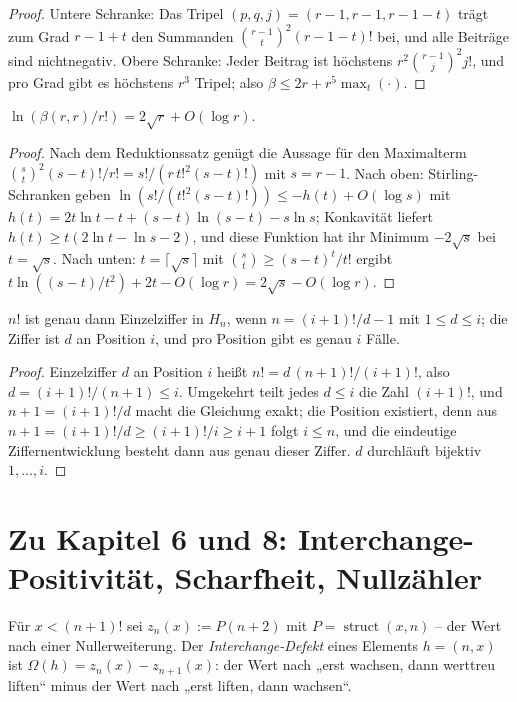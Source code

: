 \begin{proof}
Untere Schranke: Das Tripel $(p,q,j)=(r{-}1,r{-}1,r{-}1{-}t)$ trägt
zum Grad $r{-}1{+}t$ den Summanden
$\binom{r-1}{t}^2(r{-}1{-}t)!$ bei, und alle Beiträge sind
nichtnegativ. Obere Schranke: Jeder Beitrag ist höchstens
$r^2\binom{r-1}{j}^2j!$, und pro Grad gibt es höchstens $r^3$
Tripel; also $\beta\le2r+r^5\max_t(\cdot)$.
\end{proof}

\begin{satz}
$\ln(\beta(r,r)/r!)=2\sqrt r+O(\log r)$.
\end{satz}

\begin{proof}
Nach dem Reduktionssatz genügt die Aussage für den Maximalterm
$\binom st^2(s-t)!/r!=s!/(r\,t!^2(s-t)!)$ mit $s=r-1$. Nach oben:
Stirling-Schranken geben $\ln(s!/(t!^2(s-t)!))\le-h(t)+O(\log s)$
mit $h(t)=2t\ln t-t+(s{-}t)\ln(s{-}t)-s\ln s$; Konkavität liefert
$h(t)\ge t(2\ln t-\ln s-2)$, und diese Funktion hat ihr Minimum
$-2\sqrt s$ bei $t=\sqrt s$. Nach unten: $t=\lceil\sqrt s\rceil$
mit $\binom st\ge(s-t)^t/t!$ ergibt
$t\ln((s-t)/t^2)+2t-O(\log r)=2\sqrt s-O(\log r)$.
\end{proof}

\begin{satz}
$n!$ ist genau dann Einzelziffer in $H_n$, wenn $n=(i{+}1)!/d-1$
mit $1\le d\le i$; die Ziffer ist $d$ an Position $i$, und pro
Position gibt es genau $i$ Fälle.
\end{satz}

\begin{proof}
Einzelziffer $d$ an Position $i$ heißt $n!=d\,(n+1)!/(i+1)!$, also
$d=(i+1)!/(n+1)\le i$. Umgekehrt teilt jedes $d\le i$ die Zahl
$(i+1)!$, und $n+1=(i+1)!/d$ macht die Gleichung exakt; die
Position existiert, denn aus $n{+}1=(i{+}1)!/d\ge(i{+}1)!/i\ge
i{+}1$ folgt $i\le n$, und die eindeutige Ziffernentwicklung
besteht dann aus genau dieser Ziffer.
$d$ durchläuft bijektiv $1,\ldots,i$.
\end{proof}

\section*{Zu Kapitel 6 und 8: Interchange-Positivität, Scharfheit,
Nullzähler}

Für $x<(n{+}1)!$ sei $z_n(x):=P(n{+}2)$ mit
$P=\operatorname{struct}(x,n)$ -- der Wert nach einer
Nullerweiterung. Der \emph{Interchange-Defekt} eines Elements
$h=(n,x)$ ist
$\Omega(h)=z_n(x)-z_{n+1}(x)$: der Wert nach „erst wachsen, dann
werttreu liften“ minus der Wert nach „erst liften, dann wachsen“.

